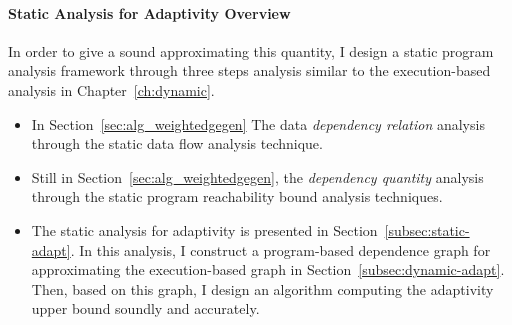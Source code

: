 \paragraph{{Static Analysis for Adaptivity Overview}}
In order to give a sound approximating this quantity, I design a static program analysis framework through three steps analysis
similar to the execution-based analysis in Chapter~\ref{ch:dynamic}.
\begin{itemize}
   \item In Section~\ref{sec:alg_weightedgegen}
   The data \emph{dependency relation} analysis through the static data flow analysis technique.
   \item Still in Section~\ref{sec:alg_weightedgegen}, the \emph{dependency quantity} analysis through the static program reachability bound analysis techniques.
   \item The static analysis for adaptivity is presented in Section~\ref{subsec:static-adapt}.
   In this analysis, I construct a program-based dependence graph for approximating the execution-based graph in Section~\ref{subsec:dynamic-adapt}.
   Then, based on this graph, I design an algorithm
   computing the adaptivity upper bound soundly 
   and accurately.
   \end{itemize}